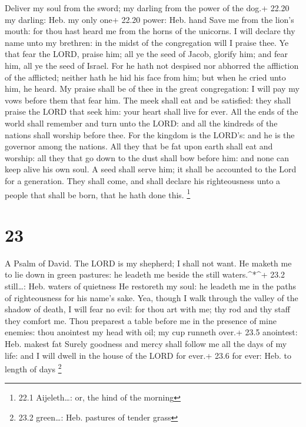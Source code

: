 Deliver my soul from the sword; my darling from the power of the dog.+
22.20 my darling: Heb. my only one+ 22.20 power: Heb. hand 
Save me from the lion's mouth: for thou hast heard me from the horns of
the unicorns.  I will declare thy name unto my brethren: in
the midst of the congregation will I praise thee.  Ye that
fear the LORD, praise him; all ye the seed of Jacob, glorify him; and
fear him, all ye the seed of Israel.  For he hath not
despised nor abhorred the affliction of the afflicted; neither hath he
hid his face from him; but when he cried unto him, he heard.
 My praise shall be of thee in the great congregation: I
will pay my vows before them that fear him.  The meek shall
eat and be satisfied: they shall praise the LORD that seek him: your
heart shall live for ever.  All the ends of the world shall
remember and turn unto the LORD: and all the kindreds of the nations
shall worship before thee.  For the kingdom is the LORD's:
and he is the governor among the nations.  All they that be
fat upon earth shall eat and worship: all they that go down to the dust
shall bow before him: and none can keep alive his own soul.
 A seed shall serve him; it shall be accounted to the Lord
for a generation.  They shall come, and shall declare his
righteousness unto a people that shall be born, that he hath done this.
\footnote{22.1 Aijeleth\ldots: or, the hind of the morning}

\hypertarget{section-22}{%
\section{23}\label{section-22}}

A Psalm of David.  The LORD is my shepherd; I shall not
want.  He maketh me to lie down in green pastures: he
leadeth me beside the still waters.\^{}*\^{}+ 23.2 still\ldots: Heb.
waters of quietness  He restoreth my soul: he leadeth me in
the paths of righteousness for his name's sake.  Yea, though
I walk through the valley of the shadow of death, I will fear no evil:
for thou art with me; thy rod and thy staff they comfort me.
 Thou preparest a table before me in the presence of mine
enemies: thou anointest my head with oil; my cup runneth over.+ 23.5
anointest: Heb. makest fat  Surely goodness and mercy shall
follow me all the days of my life: and I will dwell in the house of the
LORD for ever.+ 23.6 for ever: Heb. to length of days \footnote{23.2
  green\ldots: Heb. pastures of tender grass}

